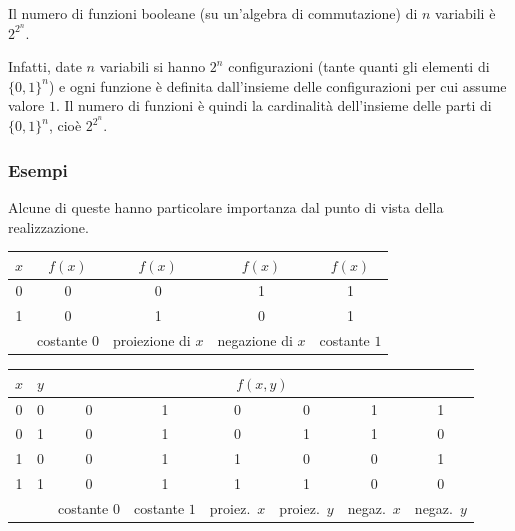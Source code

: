 \documentclass[11pt,a4paper]{article}
\begin{document}
\begin{proposizione}
Il numero di funzioni booleane (su un'algebra di commutazione) di $n$ variabili
è $2^{2^n}$.
\end{proposizione}

Infatti, date $n$ variabili si hanno $2^n$ configurazioni (tante quanti gli
elementi di $\{0,1\}^n$) e ogni funzione è definita dall'insieme delle
configurazioni per cui assume valore $1$. Il numero di funzioni è quindi la
cardinalità dell'insieme delle parti di $\{0,1\}^n$, cioè $2^{2^n}$.

\subsubsection{Esempi}

\begin{esempio}
Alcune di queste hanno particolare importanza dal punto di vista della
realizzazione.
\begin{center}
\begin{tabular}{c|cccc}
$x$ & $f(x)$ & $f(x)$ & $f(x)$ & $f(x)$ \\ \midrule
0 & 0 & 0 & 1 & 1 \\
1 & 0 & 1 & 0 & 1 \\ \midrule
  & \footnotesize costante $0$ & \footnotesize proiezione di $x$
  & \footnotesize negazione di $x$ & \footnotesize costante $1$
\end{tabular}
\end{center}
\end{esempio}

\begin{esempio}
\begin{center}
\small
\begin{tabular}{cc|cccccc}
$x$ & $y$ & \multicolumn{6}{c}{$f(x,y)$} \\ \midrule
0 & 0 & 0 & 1 & 0 & 0 & 1 & 1 \\
0 & 1 & 0 & 1 & 0 & 1 & 1 & 0 \\
1 & 0 & 0 & 1 & 1 & 0 & 0 & 1 \\
1 & 1 & 0 & 1 & 1 & 1 & 0 & 0 \\ \midrule
\multicolumn{2}{c|}{}
  & \footnotesize costante $0$ & \footnotesize costante $1$
  & \footnotesize proiez.\ $x$ & \footnotesize proiez.\ $y$
  & \footnotesize negaz.\ $x$ & \footnotesize negaz.\ $y$
\end{tabular}
\end{center}
\end{esempio}
\end{document}
